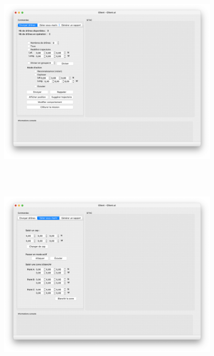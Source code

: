 \documentclass[12pt,a4paper]{scrartcl}
\theoremstyle{plain}
\theoremstyle{definition}
\theoremstyle{remark}
\begin{document}
		\begin{figure}[H]
		\centering
		\includegraphics[height=10cm]{img/maquette/Client/ihm_client1.png} 
	\end{figure}
			\begin{figure}[H]
		\centering
		\includegraphics[height=10cm]{img/maquette/Client/ihm_client2.png} 
	\end{figure}
\end{document}
